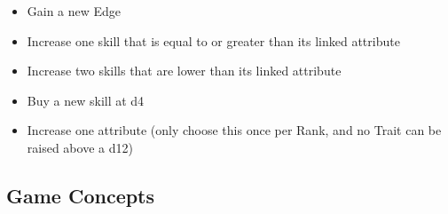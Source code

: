 \documentclass[10pt,twoside]{article}
\begin{document}
\begin{multicols}{2}
  \begin{itemize}
    \item Gain a new Edge
    \item Increase one skill that is equal to or greater than its linked attribute
    \item Increase two skills that are lower than its linked attribute
    \item Buy a new skill at d4
    \item Increase one attribute (only choose this once per Rank, and no Trait can be raised above a d12)
  \end{itemize}
  
  \subsection{Game Concepts}
  

\end{multicols}
\end{document}
